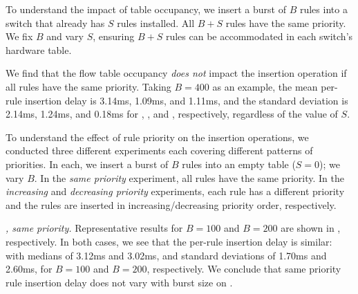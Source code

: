 
 To understand the impact of table occupancy, we
insert a burst of $B$ rules into a switch that already has $S$ rules
installed. All $B+S$ rules have the same priority. We fix $B$ and
vary $S$, ensuring $B+S$ rules can be accommodated in each switch's hardware
table.


We find that the flow table occupancy {\em
does not} impact the insertion operation if all rules have the same priority.
Taking $B=400$ as an example, the mean per-rule insertion delay is 3.14ms, 
1.09ms, and 1.11ms, and the standard
deviation is 2.14ms, 1.24ms, and 0.18ms for \BroadcomOne, \BroadcomThree,
and \Intel, respectively, regardless of the value of $S$. 

 To understand the effect of rule priority on the
insertion operations, we conducted three different experiments each covering
different patterns of priorities. In each, we insert a burst of $B$ rules
into an empty table ($S=0$); we vary $B$. In the {\em same priority}
experiment, all rules have the same priority. In the {\em increasing} and
{\em decreasing priority} experiments, each rule has a different priority and
the rules are inserted in increasing/decreasing priority order, respectively. 

\emph{\BroadcomOne, same priority.} 
Representative results for $B=100$ and $B=200$ are shown in
, respectively. In both
cases, we see that the per-rule insertion delay is similar: with
medians of 3.12ms and 3.02ms, and standard deviations of 1.70ms and 2.60ms, 
for $B=100$ and $B=200$, respectively. 
We conclude that same priority rule insertion delay does not vary with burst size on \BroadcomOne.

